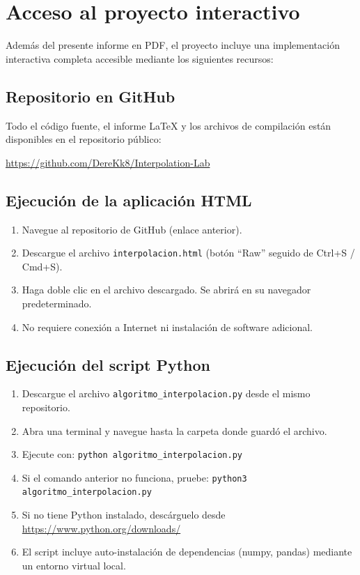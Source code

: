 \documentclass[12pt, letterpaper]{article}
\begin{document}
\newpage
\appendix
\section{Acceso al proyecto interactivo}\label{sec:acceso}

Además del presente informe en PDF, el proyecto incluye una implementación interactiva completa accesible mediante los siguientes recursos:

\subsection{Repositorio en GitHub}

Todo el código fuente, el informe LaTeX y los archivos de compilación están disponibles en el repositorio público:

\begin{center}
\url{https://github.com/DereKk8/Interpolation-Lab}
\end{center}

\subsection{Ejecución de la aplicación HTML}

\begin{enumerate}
    \item Navegue al repositorio de GitHub (enlace anterior).
    \item Descargue el archivo \texttt{interpolacion.html} (botón ``Raw'' seguido de Ctrl+S / Cmd+S).
    \item Haga doble clic en el archivo descargado. Se abrirá en su navegador predeterminado.
    \item No requiere conexión a Internet ni instalación de software adicional.
\end{enumerate}

\subsection{Ejecución del script Python}

\begin{enumerate}
    \item Descargue el archivo \texttt{algoritmo\_interpolacion.py} desde el mismo repositorio.
    \item Abra una terminal y navegue hasta la carpeta donde guardó el archivo.
    \item Ejecute con: \texttt{python algoritmo\_interpolacion.py}
    \item Si el comando anterior no funciona, pruebe: \texttt{python3 algoritmo\_interpolacion.py}
    \item Si no tiene Python instalado, descárguelo desde \url{https://www.python.org/downloads/}
    \item El script incluye auto-instalación de dependencias (numpy, pandas) mediante un entorno virtual local.
\end{enumerate}
\end{document}
